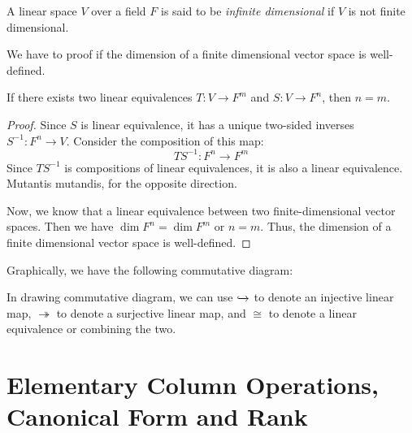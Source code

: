 \documentclass[
	11pt, %
	fleqn, %
	a4paper, %
]{LegrandOrangeBook}
\begin{document}
\begin{definition}
    A linear space $V$ over a field $F$ is said to be \emph{infinite dimensional} if $V$ is not finite dimensional.
\end{definition}

We have to proof if the dimension of a finite dimensional vector space is well-defined.

\begin{proposition}
    If there exists two linear equivalences $T: V \to F^m$ and $S: V \to F^n$, then $n = m$.
\end{proposition}

\begin{proof}
    Since $S$ is linear equivalence, it has a unique two-sided inverses $S^{-1}: F^n \to V$. Consider the composition of this map:
    \[
        TS^{-1}: F^n \to F^m
    \]
    Since $TS^{-1}$ is compositions of linear equivalences, it is also a linear equivalence. Mutantis mutandis, for the opposite direction.

    Now, we know that a linear equivalence between two finite-dimensional vector spaces. Then we have $\dim F^n = \dim F^m$ or $n = m$. Thus, the dimension of a finite dimensional vector space is well-defined.
\end{proof}

Graphically, we have the following commutative diagram:
\begin{center}
\end{center}

\begin{remark}
    In drawing commutative diagram, we can use $\xhookrightarrow{}$ to denote an injective linear map, $\twoheadrightarrow$ to denote a surjective linear map, and $\cong$ to denote a linear equivalence or combining the two.
\end{remark}

\newpage

\section{Elementary Column Operations, Canonical Form and Rank}
\end{document}

